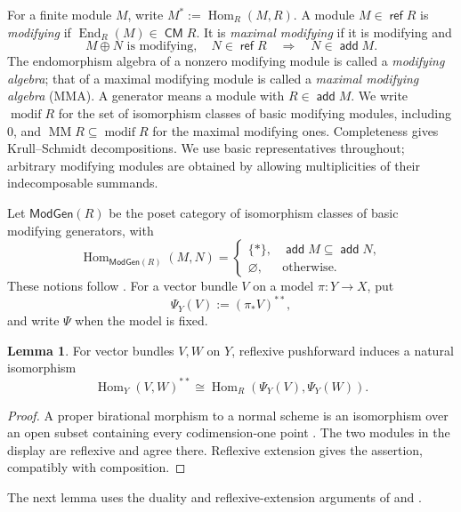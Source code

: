 \documentclass[a4paper,reqno]{amsart}
\DeclareMathOperator{\CM}{\mathsf{CM}}
\DeclareMathOperator{\refl}{\mathsf{ref}}
\DeclareMathOperator{\add}{\mathsf{add}}
\DeclareMathOperator{\Hom}{Hom}
\DeclareMathOperator{\End}{End}
\DeclareMathOperator{\modif}{modif}
\DeclareMathOperator{\MM}{MM}
\theoremstyle{definition}
\newtheorem{Lem}[Thm]{Lemma}
\begin{document}
For a finite module $M$, write $M^*:=\Hom_R(M,R)$. A module $M\in\refl R$ is \emph{modifying} if $\End_R(M)\in\CM R$. It is \emph{maximal modifying} if it is modifying and
\[
M\oplus N\text{ is modifying},\quad N\in\refl R
\quad\Longrightarrow\quad N\in\add M.
\]
The endomorphism algebra of a nonzero modifying module is called a \emph{modifying algebra}; that of a maximal modifying module is called a \emph{maximal modifying algebra} (MMA). A generator means a module with $R\in\add M$. We write $\modif R$ for the set of isomorphism classes of basic modifying modules, including $0$, and $\MM R\subseteq\modif R$ for the maximal modifying ones. Completeness gives Krull--Schmidt decompositions. We use basic representatives throughout; arbitrary modifying modules are obtained by allowing multiplicities of their indecomposable summands.

Let $\mathsf{ModGen}(R)$ be the poset category of isomorphism classes of basic modifying generators, with
\[
\Hom_{\mathsf{ModGen}(R)}(M,N)=
\begin{cases}
\{\ast\},&\add M\subseteq\add N,\\
\varnothing,&\text{otherwise}.
\end{cases}
\]
These notions follow \cite[Section 1]{IW}. For a vector bundle $V$ on a model $\pi\colon Y\to X$, put
\[
\Psi_Y(V):=(\pi_*V)^{**},
\]
and write $\Psi$ when the model is fixed.

\begin{Lem}\label{lem:reflexive-hom-comparison}
For vector bundles $V,W$ on $Y$, reflexive pushforward induces a natural isomorphism
\[
\Hom_Y(V,W)^{**}\cong\Hom_R(\Psi_Y(V),\Psi_Y(W)).
\]
\end{Lem}
\begin{proof}
A proper birational morphism to a normal scheme is an isomorphism over an open subset containing every codimension-one point \cite[Tag 0BFP]{stacks-project}. The two modules in the display are reflexive and agree there. Reflexive extension gives the assertion, compatibly with composition.
\end{proof}

The next lemma uses the duality and reflexive-extension arguments of \cite[Lemma 3.2.9 and Proposition 3.2.10]{VdB04b} and \cite[Lemma 4.8]{IW14}.
\end{document}
